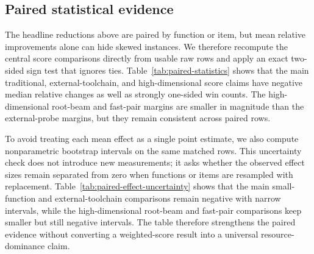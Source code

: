 \documentclass[11pt]{article}
\begin{document}
\subsection{Paired statistical evidence}

The headline reductions above are paired by function or item, but mean
relative improvements alone can hide skewed instances.  We therefore recompute
the central score comparisons directly from usable raw rows and apply an exact
two-sided sign test that ignores ties.  Table~\ref{tab:paired-statistics}
shows that the main traditional, external-toolchain, and high-dimensional
score claims have negative median relative changes as well as strongly
one-sided win counts.  The high-dimensional root-beam and fast-pair margins are
smaller in magnitude than the external-probe margins, but they remain
consistent across paired rows.

\begin{table}[H]
\centering
\scriptsize
\setlength{\tabcolsep}{3pt}
\renewcommand{\arraystretch}{1.06}
\caption{Paired statistical evidence for score comparisons.  Rows are
recomputed from correct, non-skipped raw CSV entries matched by item name.
Negative mean and median changes favor the target method; $\log_{10}p$ is from
a two-sided exact sign test over wins and losses, ignoring ties.}
\label{tab:paired-statistics}

\end{table}

To avoid treating each mean effect as a single point estimate, we also compute
nonparametric bootstrap intervals on the same matched rows.  This uncertainty
check does not introduce new measurements; it asks whether the observed effect
sizes remain separated from zero when functions or items are resampled with
replacement.  Table~\ref{tab:paired-effect-uncertainty} shows that the main
small-function and external-toolchain comparisons remain negative with narrow
intervals, while the high-dimensional root-beam and fast-pair comparisons keep
smaller but still negative intervals.  The table therefore strengthens the
paired evidence without converting a weighted-score result into a universal
resource-dominance claim.

\begin{table}[H]
\centering
\scriptsize
\setlength{\tabcolsep}{2pt}
\renewcommand{\arraystretch}{1.05}
\caption{Bootstrap uncertainty intervals for paired score-effect estimates.
Rows reuse the matched pairs from Table~\ref{tab:paired-statistics}.
Intervals are percentile bootstrap intervals over relative score changes;
negative values favor the target method.}
\label{tab:paired-effect-uncertainty}

\end{table}
\end{document}
